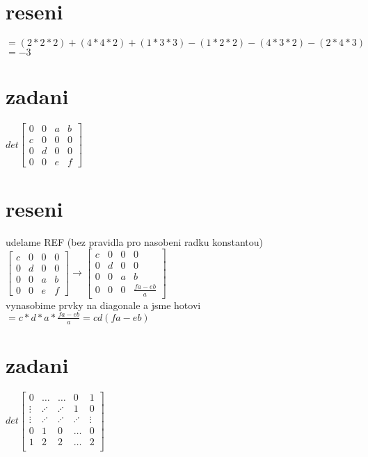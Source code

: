 \documentclass[a4paper]{article}
\begin{document}
\section*{reseni}
$
= (2*2*2) + (4*4*2) + (1*3*3) - (1*2*2) - (4*3*2) - (2*4*3)
$\\
$= -3$



\section*{zadani}
$det
\left[ \begin{matrix} 
	0 & 0 & a & b \\
	c & 0 & 0 & 0 \\
	0 & d & 0 & 0 \\
	0 & 0 & e & f
\end{matrix} \right]
$

\section*{reseni}
udelame REF (bez pravidla pro nasobeni radku konstantou)\\
$
\left[ \begin{matrix} 
	c & 0 & 0 & 0 \\
	0 & d & 0 & 0 \\
	0 & 0 & a & b \\
	0 & 0 & e & f
\end{matrix} \right]
\rightarrow
\left[ \begin{matrix} 
	c & 0 & 0 & 0 \\
	0 & d & 0 & 0 \\
	0 & 0 & a & b \\
	0 & 0 & 0 & \frac{fa-eb}{a}
\end{matrix} \right]
$\\
vynasobime prvky na diagonale a jsme hotovi\\
$= c*d*a*\frac{fa-eb}{a}=cd(fa-eb)$




\section*{zadani}
$det
\left[ \begin{matrix} 
	0 & \dots & \dots & 0 & 1 \\
	\vdots & \iddots & \iddots & 1 & 0 \\
	\vdots & \iddots & \iddots & \iddots & \vdots \\
	0 & 1 & 0 & \dots & 0 \\
	1 & 2 & 2 & \dots & 2 \\
\end{matrix} \right]
$
\end{document}
